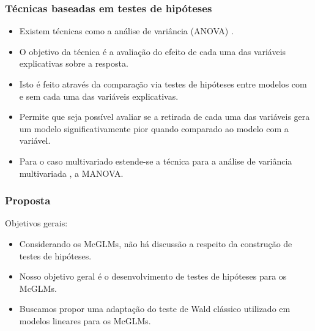 \documentclass[10pt,
  aspectratio=169,
  serif,
  mathserif,
  professionalfont,
  compress,
  handout,
  ]{beamer}\usepackage[]{graphicx}\usepackage[]{color}
\begin{document}
\begin{frame}
  \frametitle{Técnicas baseadas em testes de hipóteses}

  \begin{itemize}
    \itemsep 2ex

  \item Existem técnicas como a análise de variância (ANOVA) \cite{anova_fisher}. 
  
  \item O objetivo da técnica é a avaliação do efeito de cada uma das variáveis explicativas sobre a resposta. 

  \item Isto é feito através da comparação via testes de hipóteses entre modelos com e sem cada uma das variáveis explicativas.

  \item Permite que seja possível avaliar se a retirada de cada uma das variáveis gera um modelo significativamente pior quando comparado ao modelo com a variável. 

  \item Para o caso multivariado estende-se a técnica para a análise de variância multivariada \cite{manova}, a MANOVA. 

  \end{itemize}

\end{frame}


\begin{frame}
  \frametitle{Proposta}

Objetivos gerais:

  \begin{itemize}
    \itemsep 2ex

  \item Considerando os McGLMs, não há discussão a respeito da construção de testes de hipóteses.
  
  \item Nosso objetivo geral é o desenvolvimento de testes de hipóteses para os McGLMs.

  \item Buscamos propor uma adaptação do teste de Wald clássico utilizado em modelos lineares para os McGLMs. 

  \end{itemize}

\end{frame}
\end{document}
